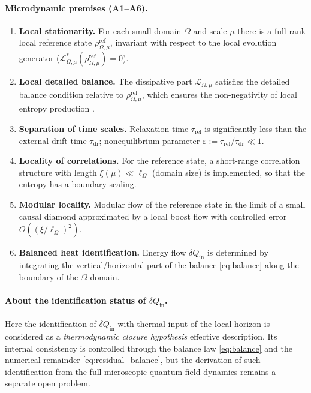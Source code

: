 \documentclass[11pt,a4paper]{article}
\theoremstyle{definition}
\theoremstyle{plain}
\theoremstyle{remark}
\begin{document}
\paragraph{Microdynamic premises (A1--A6).}
\begin{enumerate}[label=(A\arabic*),leftmargin=*,itemsep=2pt]
\item \textbf{Local stationarity.}
For each small domain $\Omega$ and scale $\mu$ there is a full-rank local reference state
$\rho^{\mathrm{ref}}_{\Omega,\mu}$, invariant with respect to the local evolution generator
($\mathcal L_{\Omega,\mu}^{*}(\rho^{\mathrm{ref}}_{\Omega,\mu})=0$).
\item \textbf{Local detailed balance.}
The dissipative part $\mathcal L_{\Omega,\mu}$ satisfies the detailed balance condition relative to
$\rho^{\mathrm{ref}}_{\Omega,\mu}$, which ensures the non-negativity of local entropy production \cite{Spohn1978EntropyProduction}.
\item \textbf{Separation of time scales.}
Relaxation time $\tau_{\mathrm{rel}}$ is significantly less than the external drift time
$\tau_{\mathrm{dr}}$; nonequilibrium parameter
$\varepsilon:=\tau_{\mathrm{rel}}/\tau_{\mathrm{dr}}\ll 1$.
\item \textbf{Locality of correlations.}
For the reference state, a short-range correlation structure
with length $\xi(\mu)\ll \ell_\Omega$ (domain size) is implemented, so that the entropy has a boundary scaling.
\item \textbf{Modular locality.}
Modular flow of the reference state in the limit of a small causal diamond
approximated by a local boost flow with controlled error
$O((\xi/\ell_\Omega)^2)$.
\item \textbf{Balanced heat identification.}
Energy flow $\delta Q_{\mathrm{in}}$ is determined by integrating the vertical/horizontal part of the balance
\eqref{eq:balance} along the boundary of the $\Omega$ domain.
\end{enumerate}

\paragraph{About the identification status of $\delta Q_{\mathrm{in}}$.}
Here the identification of $\delta Q_{\mathrm{in}}$ with thermal input of the local horizon
is considered as a \emph{thermodynamic closure hypothesis} effective description.
Its internal consistency is controlled through the balance law \eqref{eq:balance}
and the numerical remainder \eqref{eq:residual_balance}, but the derivation of such identification from the full
microscopic quantum field dynamics remains a separate open problem.
\end{document}
